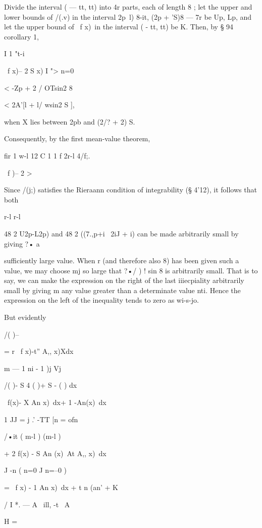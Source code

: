 Divide the interval ( — tt, tt) into 4r parts, each of length 8 ; let
the upper and lower bounds of /(.v) in the interval 2p~l) 8-it, (2p +
'S)8 — 7r be Up, Lp, and let the upper bound of \ f x)\ in the
interval ( - tt, tt) be K. Then, by § 94 corollary 1,



I 1 "t-i

\ f x)-- 2 S x) I "> n=0



< -Zp + 2 / OTsin2 8

< 2A'[l + l/ wsin2 S ],



when X lies between 2pb and (2/? + 2) S.

Consequently, by the first mean-value theorem,

fir 1 w-l 12 C 1 1 f 2r-l 4/f;. \

\ f )-- 2 >%

Since /(j;) satisfies the Rieraann condition of integrability (§
4'12), it follows that both

r-l r-l

48 2 U2p-L2p) and 48 2 ((7.,p+i~ 2iJ + i) can be made arbitrarily
small by giving ?• a

sufficiently large value. When r (and therefore also 8) has been given
such a value, we may choose mj so large that ?•/ ) ! sin 8 is
arbitrarily small. That is to say, we can make the expression on the
right of the last iiiecpiality arbitrarily small by giving m any value
greater than a determinate value nti. Hence the expression on the left
of the inequality tends to zero as wi-s-jo.

But evidently

/( )-- %

= r \ f x)-t'' A,, x)Xdx

m — 1 ni - 1 )j Vj

/( )- S 4 ( )+ S - ( ) dx

\ f(x)- X An x)\ dx+ 1 -An(x)\ dx

1 JJ = j .' -TT [n = ofn

/•it ( m-l ) (m-l )

+ 2 f(x) - S An (x)\ At A,, x)\ dx

J -n ( n=0 J n=--0 )

= \ f x) - 1 An x)\ dx + t n (an' + K

/ I *. — A \ ill, -t \ A



H =



